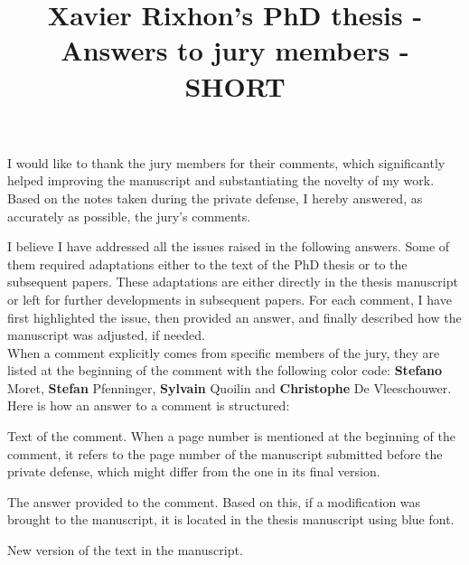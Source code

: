 \documentclass[12pt,a4paper]{article}
\title{\vspace{-1cm}
\begin{flushleft} {\sffamily Xavier Rixhon's PhD thesis - Answers to jury members - SHORT}\end{flushleft}}
\date{\vspace{-1.7cm}\begin{flushleft}\sffamily Exploration of uncertainty-aware energy transition pathways - Reinforcement learning and principal component analysis-based methods\end{flushleft}}
\begin{document}
\maketitle

I would like to thank the jury members for their comments, which significantly helped improving the manuscript and substantiating the novelty of my work. Based on the notes taken during the private defense, I hereby answered, as accurately as possible, the jury's comments. 

I believe I have addressed all the issues raised in the following answers. Some of them required adaptations either to the text of the PhD thesis or to the subsequent papers. These adaptations are either directly in the thesis manuscript or left for further developments in subsequent papers. For each comment, I have first highlighted the issue, then provided an answer, and finally described how the manuscript was adjusted, if needed.\\

When a comment explicitly comes from specific members of the jury, they are listed at the beginning of the comment with the following color code: {\color{orange} \textbf{Stefano} Moret}, {\color{teal} \textbf{Stefan} Pfenninger}, {\color{purple} \textbf{Sylvain} Quoilin} and {\color{violet} \textbf{Christophe} De Vleeschouwer}. Here is how an answer to a comment is structured:

\begin{mdframed}[style=comment] %
Text of the comment. When a page number is mentioned at the beginning of the comment, it refers to the page number of the manuscript submitted before the private defense, which might differ from the one in its final version.
\end{mdframed}

\noindent The answer provided to the comment. Based on this, if a modification was brought to the manuscript, it is located in the thesis manuscript using {\color{blue} blue font}.

\begin{mdframed}[style=manuscript] %
New version of the text in the manuscript.
\end{mdframed}


\clearpage
\tableofcontents
\end{document}
